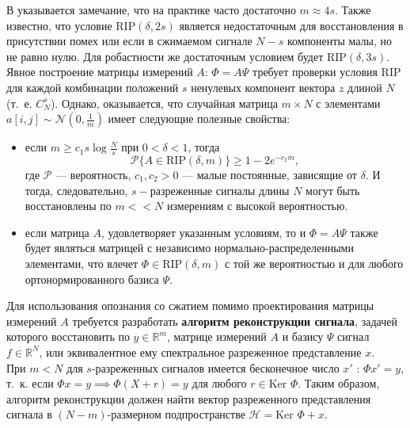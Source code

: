 \documentclass[14pt]{matmex-diploma}
\begin{document}
В \cite{cande2008introduction} указывается замечание, что на практике часто достаточно $m\approx 4s$. Также известно, что условие $\text{RIP}(\delta, 2s)$ является недостаточным для восстановления в присутствии помех или если в сжимаемом сигнале $N - s$ компоненты малы, но не равно нулю. Для робастности же достаточным условием будет $\text{RIP}(\delta, 3s)$. Явное построение матрицы измерений $A$: $\Phi = A\Psi$ требует проверки условия RIP для каждой комбинации положений $s$ ненулевых компонент вектора $z$ длиной $N$ (т.~е. $C_N^s$). Однако, оказывается, что случайная матрица $m \times N$ с элементами $a[i, j] \sim \mathcal{N}(0, \frac{1}{m})$ имеет следующие полезные свойства\cite{candes2006robust}:
\begin{itemize}
\item если $m \geq c_1 s \log{\frac{N}{s}}$ при $0 < \delta < 1$, тогда \\
$$\mathcal{P}\{A \in \text{RIP}(\delta, m)\} \geq 1 - 2e^{-c_2 m},$$
где $\mathcal{P}$ --- вероятность, $c_1,c_2 > 0$  --- малые постоянные, зависящие от $\delta$. И тогда, следовательно, $s-$разреженные сигналы длины $N$ могут быть восстановлены по $m << N$ измерениям с высокой вероятностью.
\item если матрица $A$, удовлетворяет указанным условиям, то и $\Phi = A\Psi$ также будет являться матрицей с независимо нор\-маль\-но-рас\-пре\-де\-лен\-ными элементами, что влечет $\Phi \in \text{RIP}(\delta ,m)$ с той же вероятностью и для любого ортонормированного базиса $\Psi$.
\end{itemize}

Для использования опознания со сжатием помимо проектирования матрицы измерений $A$ требуется разработать \textbf{алгоритм реконструкции сигнала}, задачей которого восстановить по $y \in \mathbb{R}^m$, матрице измерений $A$ и базису $\Psi$ сигнал $f \in \mathbb{R}^N$, или эквивалентное ему спектральное разреженное представление $x$.\\

При $m < N$ для $s$-разреженных сигналов имеется бесконечное число $x'$ : $\Phi x' = y$, т.~к. если $\Phi x = y \implies \Phi(X+r) = y$ для любого $r \in \text{Ker }\Phi$. Таким образом, алгоритм реконструкции должен найти вектор разреженного представления сигнала в $(N - m)$-размерном подпространстве $\mathcal{H}=\text{Ker }\Phi + x$.\\
\end{document}
